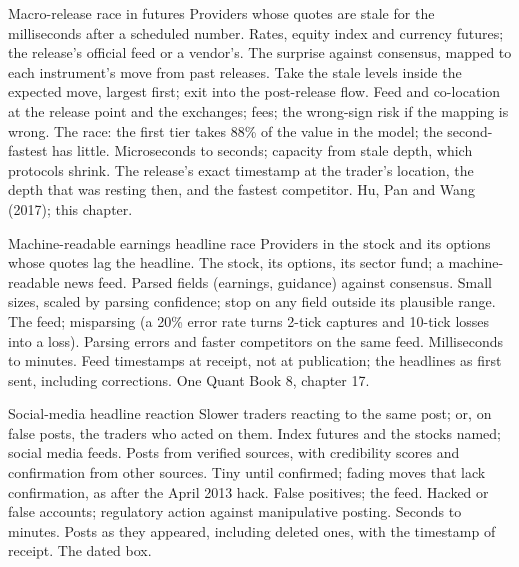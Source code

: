 \begin{strategyfile}{Macro-release race in futures}\label{strat:hf:news-and-event-trading:macro}
 Providers whose quotes are stale for the milliseconds after a scheduled number.
 Rates, equity index and currency futures; the release's official feed or a vendor's.
 The surprise against consensus, mapped to each instrument's move from past releases.
 Take the stale levels inside the expected move, largest first; exit into the post-release flow.
 Feed and co-location at the release point and the exchanges; fees; the wrong-sign risk if the mapping is wrong.
 The race: the first tier takes 88\% of the value in the model; the second-fastest has little.
 Microseconds to seconds; capacity from stale depth, which protocols shrink.
 The release's exact timestamp at the trader's location, the depth that was resting then, and the fastest competitor.
 Hu, Pan and Wang (2017); this chapter.
\end{strategyfile}

\begin{strategyfile}{Machine-readable earnings headline race}\label{strat:hf:news-and-event-trading:earnings}
 Providers in the stock and its options whose quotes lag the headline.
 The stock, its options, its sector fund; a machine-readable news feed.
 Parsed fields (earnings, guidance) against consensus.
 Small sizes, scaled by parsing confidence; stop on any field outside its plausible range.
 The feed; misparsing (a 20\% error rate turns 2-tick captures and 10-tick losses into a loss).
 Parsing errors and faster competitors on the same feed.
 Milliseconds to minutes.
 Feed timestamps at receipt, not at publication; the headlines as first sent, including corrections.
 One Quant Book 8, chapter 17.
\end{strategyfile}

\begin{strategyfile}{Social-media headline reaction}\label{strat:hf:news-and-event-trading:social}
 Slower traders reacting to the same post; or, on false posts, the traders who acted on them.
 Index futures and the stocks named; social media feeds.
 Posts from verified sources, with credibility scores and confirmation from other sources.
 Tiny until confirmed; fading moves that lack confirmation, as after the April 2013 hack.
 False positives; the feed.
 Hacked or false accounts; regulatory action against manipulative posting.
 Seconds to minutes.
 Posts as they appeared, including deleted ones, with the timestamp of receipt.
 The dated box.
\end{strategyfile}

